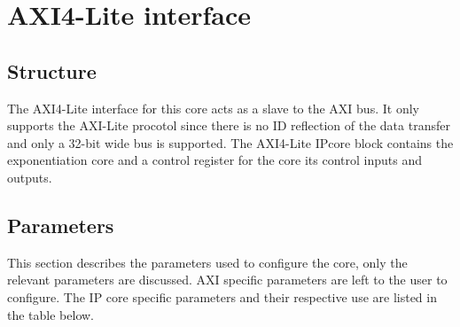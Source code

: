 \chapter{AXI4-Lite interface}
\section{Structure}
The AXI4-Lite interface for this core acts as a slave to the AXI bus. It only supports the AXI-Lite procotol since there
is no ID reflection of the data transfer and only a 32-bit wide bus is supported. The AXI4-Lite IPcore block contains the
exponentiation core and a control register for the core its control inputs and outputs.

\section{Parameters}
This section describes the parameters used to configure the core, only the relevant parameters are discussed. AXI
specific parameters are left to the user to configure. The IP core specific parameters and their respective use are
listed in the table below.

